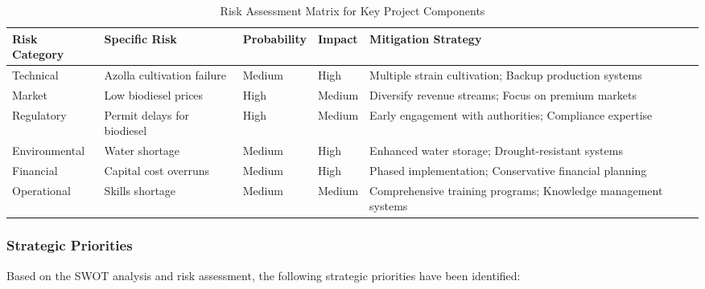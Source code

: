 \begin{table}[h]
\centering
\caption{Risk Assessment Matrix for Key Project Components}
\label{tab:risk_matrix}
\begin{tabular}{|p{3cm}|p{2cm}|p{2cm}|p{2cm}|p{3cm}|}
\hline
\textbf{Risk Category} & \textbf{Specific Risk} & \textbf{Probability} & \textbf{Impact} & \textbf{Mitigation Strategy} \\
\hline
Technical & Azolla cultivation failure & Medium & High & Multiple strain cultivation; Backup production systems \\
\hline
Market & Low biodiesel prices & High & Medium & Diversify revenue streams; Focus on premium markets \\
\hline
Regulatory & Permit delays for biodiesel & High & Medium & Early engagement with authorities; Compliance expertise \\
\hline
Environmental & Water shortage & Medium & High & Enhanced water storage; Drought-resistant systems \\
\hline
Financial & Capital cost overruns & Medium & High & Phased implementation; Conservative financial planning \\
\hline
Operational & Skills shortage & Medium & Medium & Comprehensive training programs; Knowledge management systems \\
\hline
\end{tabular}
\end{table}

\subsubsection{Strategic Priorities}

Based on the SWOT analysis and risk assessment, the following strategic priorities have been identified:

